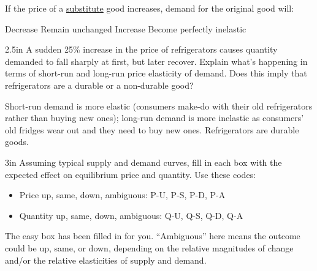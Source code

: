 \documentclass[12pt]{exam}
\begin{document}
\begin{questions}
  \begin{mcquestion}[2]
    If the price of a \underline{substitute} good increases, demand for the original good will:
    \begin{choices}
      \choice Decrease
      \choice Remain unchanged
      \CorrectChoice Increase
      \choice Become perfectly inelastic
    \end{choices}
  \end{mcquestion}


  \begin{shortanswer}[10]{2.5in}
    A sudden 25\% increase in the price of refrigerators causes quantity
    demanded to fall sharply at first, but later recover. Explain what's happening
    in terms of short-run and long-run price elasticity of demand.  Does this imply that refrigerators are a
    durable or a non-durable good?
  \end{shortanswer}
  \begin{solution}
    Short-run demand is more elastic (consumers make-do with their old refrigerators rather than buying
    new ones); long-run demand is more inelastic as consumers' old fridges wear out and they need to buy
    new ones. Refrigerators are durable goods.
  \end{solution}

  \begin{problem}[10]{3in}
    Assuming typical supply and demand curves, fill in each box with the expected effect on
    equilibrium price and quantity. Use these codes:

    \begin{itemize}
      \item Price up, same, down, ambiguous: P-U, P-S, P-D, P-A
      \item Quantity up, same, down, ambiguous:  Q-U, Q-S, Q-D, Q-A
    \end{itemize}

    The easy box has been filled in for you. ``Ambiguous'' here means the outcome could be up, same, or
    down, depending on the relative magnitudes of change and/or the relative elasticities of supply and demand.

    \vspace{0.5cm}


\end{problem}
\end{questions}
\end{document}
